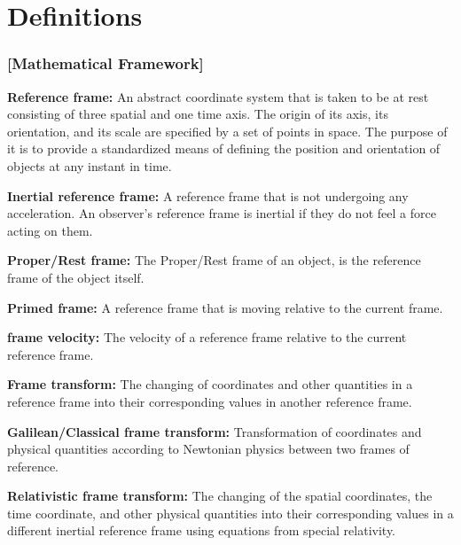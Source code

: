 
\section{Definitions}

\subsubsection{[Mathematical Framework]}%

\noindent \hypertarget{def-Reference-frame}{\textbf{Reference frame:}}
An abstract coordinate system that is taken to be at rest consisting of three spatial and one time axis. The origin of its axis, its orientation, and its scale are specified by a set of points in space. The purpose of it is to provide a standardized means of defining the position and orientation of objects at any instant in time.

\noindent \hypertarget{def-Inertial-reference-frame}{\textbf{Inertial reference frame:}}
A reference frame that is not undergoing any acceleration. An observer's reference frame is inertial if they do not feel a force acting on them.

\noindent \hypertarget{def-proper-frame}{\textbf{Proper/Rest frame:}}
The Proper/Rest frame of an object, is the reference frame of the object itself.

\noindent \hypertarget{def-Primed-Frame}{\textbf{Primed frame:}}
A reference frame that is moving relative to the current frame.

\noindent \hypertarget{def-frame-velocity}{\textbf{frame velocity:}}
The velocity of a reference frame relative to the current reference frame.

\noindent \hypertarget{def-transform}{\textbf{Frame transform:}}
The changing of coordinates and other quantities in a reference frame into their corresponding values in another reference frame.

\noindent \hypertarget{def-galilean-transform}{\textbf{Galilean/Classical frame transform:}}
Transformation of coordinates and physical quantities according to Newtonian physics between two frames of reference.

\noindent \hypertarget{def-lorentz-transform}{\textbf{Relativistic frame transform:}}
The changing of the spatial coordinates, the time coordinate, and other physical quantities into their corresponding values in a different inertial reference frame using equations from special relativity.

